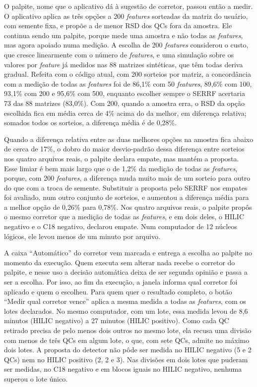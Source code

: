 O palpite, nome que o aplicativo dá à sugestão de corretor, passou então a medir. O aplicativo aplica as três opções a 200 \emph{features} sorteadas da matriz do usuário, com semente fixa, e propõe a de menor RSD dos QCs fora da amostra. Ele continua sendo um palpite, porque mede uma amostra e não todas as \emph{features}, mas agora apoiado numa medição. A escolha de 200 \emph{features} considerou o custo, que cresce linearmente com o número de \emph{features}, e uma simulação sobre os valores por \emph{feature} já medidos nas 88 matrizes sintéticas, que têm todas deriva gradual. Refeita com o código atual, com 200 sorteios por matriz, a concordância com a medição de todas as \emph{features} foi de 86,1\% com 50 \emph{features}, 89,6\% com 100, 93,1\% com 200 e 95,6\% com 500, enquanto escolher sempre o SERRF acertaria 73 das 88 matrizes (83,0\%). Com 200, quando a amostra erra, o RSD da opção escolhida fica em média cerca de 4\% acima do da melhor, em diferença relativa; somados todos os sorteios, a diferença média é de 0,28\%.

Quando a diferença relativa entre as duas melhores opções na amostra fica abaixo de cerca de 17\%, o dobro do maior desvio-padrão dessa diferença entre sorteios nos quatro arquivos reais, o palpite declara empate, mas mantém a proposta. Esse limiar é bem mais largo que o de 1,2\% da medição de todas as \emph{features}, porque, com 200 \emph{features}, a diferença muda muito mais de um sorteio para outro do que com a troca de semente. Substituir a proposta pelo SERRF nos empates foi avaliado, num outro conjunto de sorteios, e aumentou a diferença média para a melhor opção de 0,26\% para 0,78\%. Nos quatro arquivos reais, o palpite propôs o mesmo corretor que a medição de todas as \emph{features}, e em dois deles, o HILIC negativo e o C18 negativo, declarou empate. Num computador de 12 núcleos lógicos, ele levou menos de um minuto por arquivo.

A caixa ``Automático'' do corretor vem marcada e entrega a escolha ao palpite no momento da execução. Quem executa sem alterar nada recebe o corretor do palpite, e nesse uso a decisão automática deixa de ser segunda opinião e passa a ser a escolha. Por isso, ao fim da execução, a janela informa qual corretor foi aplicado e quem o escolheu. Para quem quer o resultado completo, o botão ``Medir qual corretor vence'' aplica a mesma medida a todas as \emph{features}, com os lotes declarados. No mesmo computador, com um lote, essa medida levou de 8,6 minutos (HILIC negativo) a 27 minutos (HILIC positivo). Como cada QC retirado precisa de pelo menos dois outros no mesmo lote, ela recusa uma divisão com menos de três QCs em algum lote, o que, com sete QCs, admite no máximo dois lotes. A proposta do detector não pôde ser medida no HILIC negativo (5 e 2 QCs) nem no HILIC positivo (2, 2 e 3). Nas divisões em dois lotes que puderam ser medidas, no C18 negativo e em blocos iguais no HILIC negativo, nenhuma superou o lote único.

